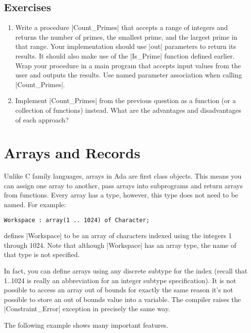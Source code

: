 \subsection*{Exercises}

\begin{enumerate}
\item Write a procedure |Count_Primes| that accepts a range of integers and returns the number
  of primes, the smallest prime, and the largest prime in that range. Your implementation should
  use |out| parameters to return its results. It should also make use of the |Is_Prime| function
  defined earlier. Wrap your procedure in a main program that accepts input values from the user
  and outputs the results. Use named parameter association when calling |Count_Primes|.

\item Implement |Count_Primes| from the previous question as a function (or a collection of
  functions) instead. What are the advantages and disadvantages of each approach?
\end{enumerate}

\section{Arrays and Records}

Unlike C family languages, arrays in Ada are first class objects. This means you can assign one
array to another, pass arrays into subprograms and return arrays from functions. Every array has
a type, however, this type does not need to be named. For example:

\begin{lstlisting}
Workspace : array(1 .. 1024) of Character;
\end{lstlisting}

defines |Workspace| to be an array of characters indexed using the integers 1 through 1024. Note
that although |Workspace| has an array type, the name of that type is not specified.

In fact, you can define arrays using any discrete subtype for the index (recall that 1..1024 is
really an abbreviation for an integer subtype specification). It is not possible to access an
array out of bounds for exactly the same reason it's not possible to store an out of bounds
value into a variable. The compiler raises the |Constraint_Error| exception in precisely the
same way.

The following example shows many important features.

